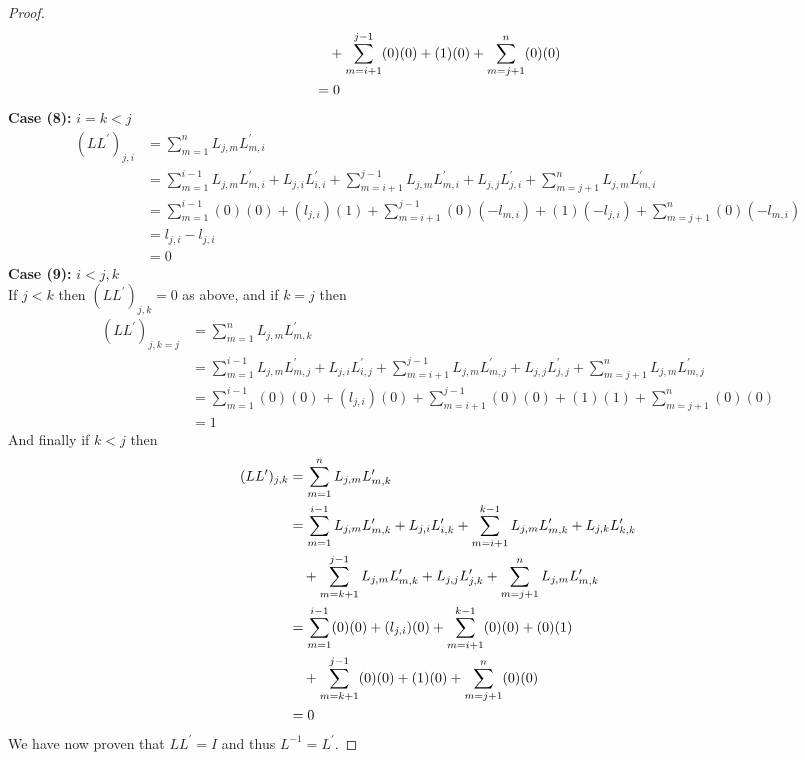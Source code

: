 \documentclass[12pt]{article}
\begin{document}
\begin{proof}
\begin{align*}
				&\text{\space \space \space} + \sum\limits_{m=i+1}^{j-1} (0)(0) + (1)(0) + \sum\limits_{m=j+1}^{n} (0)(0) \\
			& = 0
		\end{align*}
		\textbf{Case (8):} $i=k<j$
		\begin{align*}
			(LL^\prime)_{j,i} & = \sum\limits_{m=1}^n L_{j,m}L^\prime_{m,i} \\
			& = \sum\limits_{m=1}^{i-1} L_{j,m}L^\prime_{m,i} + L_{j,i}L^\prime_{i,i} + \sum\limits_{m=i+1}^{j-1} L_{j,m}L^\prime_{m,i} + L_{j,j}L^\prime_{j,i} + \sum\limits_{m=j+1}^{n} L_{j,m}L^\prime_{m,i} \\
			& = \sum\limits_{m=1}^{i-1} (0)(0) + (l_{j,i})(1) + \sum\limits_{m=i+1}^{j-1} (0)(-l_{m,i}) + (1)(-l_{j,i}) + \sum\limits_{m=j+1}^{n} (0)(-l_{m,i}) \\
			& = l_{j,i} - l_{j,i} \\
			& = 0
		\end{align*}
		\textbf{Case (9):} $i< j,k$ \\
		If $j<k$ then $(LL^\prime)_{j,k} = 0$ as above, and if $k=j$ then
		\begin{align*}
			(LL^\prime)_{j,k=j} & = \sum\limits_{m=1}^n L_{j,m}L^\prime_{m,k} \\
			& = \sum\limits_{m=1}^{i-1} L_{j,m}L^\prime_{m,j} + L_{j,i}L^\prime_{i,j} + \sum\limits_{m=i+1}^{j-1} L_{j,m}L^\prime_{m,j} + L_{j,j}L^\prime_{j,j} + \sum\limits_{m=j+1}^{n} L_{j,m}L^\prime_{m,j} \\
			& = \sum\limits_{m=1}^{i-1} (0)(0) + (l_{j,i})(0) + \sum\limits_{m=i+1}^{j-1} (0)(0) + (1)(1) + \sum\limits_{m=j+1}^{n} (0)(0)\\
			& = 1
		\end{align*}
		And finally if $k < j$ then
		\begin{align*}
			(LL^\prime)_{j,k} & = \sum\limits_{m=1}^n L_{j,m}L^\prime_{m,k} \\
			& = \sum\limits_{m=1}^{i-1} L_{j,m}L^\prime_{m,k} + L_{j,i}L^\prime_{i,k} + \sum\limits_{m=i+1}^{k-1} L_{j,m}L^\prime_{m,k} + L_{j,k}L^\prime_{k,k} \\
				&\text{\space \space \space} + \sum\limits_{m=k+1}^{j-1} L_{j,m}L^\prime_{m,k} + L_{j,j}L^\prime_{j,k} + \sum\limits_{m=j+1}^{n} L_{j,m}L^\prime_{m,k} \\
			& = \sum\limits_{m=1}^{i-1} (0)(0) + (l_{j,i})(0) + \sum\limits_{m=i+1}^{k-1} (0)(0) + (0)(1) \\
				&\text{\space \space \space} + \sum\limits_{m=k+1}^{j-1} (0)(0) + (1)(0) + \sum\limits_{m=j+1}^{n} (0)(0) \\
			& = 0
		\end{align*}
		We have now proven that $LL^\prime = I$ and thus $L^{-1}=L^\prime$.		
	\end{proof}
\end{document}
